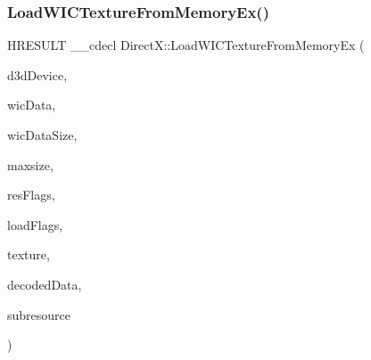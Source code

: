 \mbox{\label{namespace_direct_x_a0578d4a2b59a0e7cccada5b0337d7abe}} 
\subsubsection{\texorpdfstring{Load\+W\+I\+C\+Texture\+From\+Memory\+Ex()}{LoadWICTextureFromMemoryEx()}}
{\footnotesize\ttfamily H\+R\+E\+S\+U\+LT \+\_\+\+\_\+cdecl Direct\+X\+::\+Load\+W\+I\+C\+Texture\+From\+Memory\+Ex (\begin{DoxyParamCaption}\item[{\+\_\+\+In\+\_\+ I\+D3\+D12\+Device $\ast$}]{d3d\+Device,  }\item[{\+\_\+\+In\+\_\+reads\+\_\+bytes\+\_\+(wic\+Data\+Size) const uint8\+\_\+t $\ast$}]{wic\+Data,  }\item[{size\+\_\+t}]{wic\+Data\+Size,  }\item[{size\+\_\+t}]{maxsize,  }\item[{D3\+D12\+\_\+\+R\+E\+S\+O\+U\+R\+C\+E\+\_\+\+F\+L\+A\+GS}]{res\+Flags,  }\item[{unsigned int}]{load\+Flags,  }\item[{\+\_\+\+Outptr\+\_\+ I\+D3\+D12\+Resource $\ast$$\ast$}]{texture,  }\item[{std\+::unique\+\_\+ptr$<$ uint8\+\_\+t\mbox{[}$\,$\mbox{]}$>$ \&}]{decoded\+Data,  }\item[{D3\+D12\+\_\+\+S\+U\+B\+R\+E\+S\+O\+U\+R\+C\+E\+\_\+\+D\+A\+TA \&}]{subresource }\end{DoxyParamCaption})}

